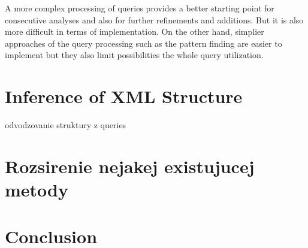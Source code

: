 A more complex processing of queries provides a better starting point for consecutive analyses and also for further refinements and additions. But it is also more difficult in terms of implementation. On the other hand, simplier approaches of the query processing such as the pattern finding are easier to implement but they also limit possibilities the whole query utilization.



\section{Inference of XML Structure}
odvodzovanie struktury z queries

\section{Rozsirenie nejakej existujucej metody}

\section{Conclusion}